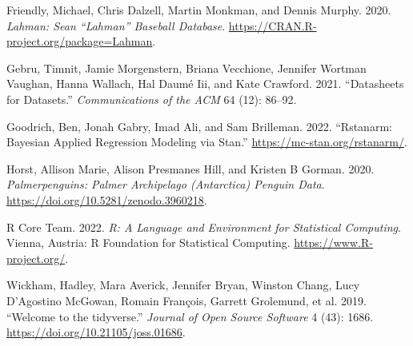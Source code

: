 \documentclass[
  letterpaper,
  DIV=11,
  numbers=noendperiod]{scrartcl}
\newlength{\cslhangindent}
\newenvironment{CSLReferences}[2] %
 {\begin{list}{}{%
  \setlength{\itemindent}{0pt}
  \setlength{\leftmargin}{0pt}
  \setlength{\parsep}{0pt}
  \ifodd #1
   \setlength{\leftmargin}{\cslhangindent}
   \setlength{\itemindent}{-1\cslhangindent}
  \fi
  \setlength{\itemsep}{#2\baselineskip}}}
 {\end{list}}
\begin{document}
\label{refs}
\begin{CSLReferences}{1}{0}
Friendly, Michael, Chris Dalzell, Martin Monkman, and Dennis Murphy.
2020. \emph{Lahman: Sean {``Lahman''} Baseball Database}.
\url{https://CRAN.R-project.org/package=Lahman}.

Gebru, Timnit, Jamie Morgenstern, Briana Vecchione, Jennifer Wortman
Vaughan, Hanna Wallach, Hal Daumé Iii, and Kate Crawford. 2021.
{``Datasheets for Datasets.''} \emph{Communications of the ACM} 64 (12):
86--92.

Goodrich, Ben, Jonah Gabry, Imad Ali, and Sam Brilleman. 2022.
{``Rstanarm: {Bayesian} Applied Regression Modeling via {Stan}.''}
\url{https://mc-stan.org/rstanarm/}.

Horst, Allison Marie, Alison Presmanes Hill, and Kristen B Gorman. 2020.
\emph{Palmerpenguins: Palmer Archipelago (Antarctica) Penguin Data}.
\url{https://doi.org/10.5281/zenodo.3960218}.

R Core Team. 2022. \emph{R: A Language and Environment for Statistical
Computing}. Vienna, Austria: R Foundation for Statistical Computing.
\url{https://www.R-project.org/}.

Wickham, Hadley, Mara Averick, Jennifer Bryan, Winston Chang, Lucy
D'Agostino McGowan, Romain François, Garrett Grolemund, et al. 2019.
{``Welcome to the {tidyverse}.''} \emph{Journal of Open Source Software}
4 (43): 1686. \url{https://doi.org/10.21105/joss.01686}.

\end{CSLReferences}
\end{document}
